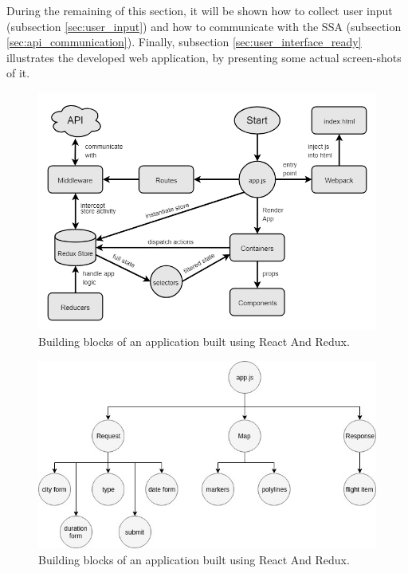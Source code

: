 During the remaining of this section, it will be shown how to collect user input (subsection \ref{sec:user_input}) and how to communicate with the SSA  (subsection \ref{sec:api_communication}). Finally, subsection \ref{sec:user_interface_ready} illustrates the developed web application, by presenting some actual screen-shots of it.

\begin{figure}[htpb]
  \centering
  \includegraphics[width=.8\textwidth]{./Figures/system_implementation/react_redux_app.png}
  \caption{Building blocks of an application built using React And Redux.}
  \label{fig:react_redux_app}  
\end{figure}

\begin{figure}[htpb]
  \centering
  \includegraphics[width=.8\textwidth]{./Figures/system_implementation/csa_tree.jpg}
  \caption{Building blocks of an application built using React And Redux.}
  \label{fig:react_redux_app}  
\end{figure}




